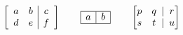 \documentclass{article}
\begin{document}
\[
\left[\begin{array}{cc|c}
a&b&c\\
d&e&f
\end{array}\right]
\qquad
\begin{array}{|c|c|}
\hline
a&b\\
\hline
\end{array}
\qquad
\left[\begin{array}{@{}cc!{|}c@{}}
p&q&r\\
s&t&u
\end{array}\right]
\]
\end{document}

